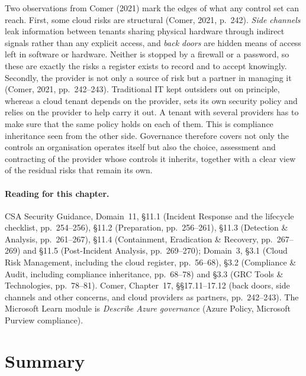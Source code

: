 Two observations from Comer (2021) mark the edges of what any control set
can reach. First, some cloud risks are structural (Comer, 2021, p.~242).
\emph{Side channels} leak information between tenants sharing physical
hardware through indirect signals rather than any explicit access, and
\emph{back doors} are hidden means of access left in software or hardware.
Neither is stopped by a firewall or a password, so these are exactly the
risks a register exists to record and to accept knowingly. Secondly, the
provider is not only a source of risk but a partner in managing it (Comer,
2021, pp.~242--243). Traditional IT kept outsiders out on principle,
whereas a cloud tenant depends on the provider, sets its own security policy
and relies on the provider to help carry it out. A tenant with several
providers has to make sure that the same policy holds on each of them. This
is compliance inheritance seen from the other side. Governance therefore
covers not only the controls an organisation operates itself but also the
choice, assessment and contracting of the provider whose controls it
inherits, together with a clear view of the residual risks that remain its
own.

\paragraph{Reading for this chapter.} CSA Security Guidance, Domain~11,
\S11.1 (Incident Response and the lifecycle checklist, pp.~254--256), \S11.2
(Preparation, pp.~256--261), \S11.3 (Detection \& Analysis, pp.~261--267),
\S11.4 (Containment, Eradication \& Recovery, pp.~267--269) and \S11.5
(Post-Incident Analysis, pp.~269--270); Domain~3, \S3.1 (Cloud Risk
Management, including the cloud register, pp.~56--68), \S3.2 (Compliance \&
Audit, including compliance inheritance, pp.~68--78) and \S3.3 (GRC Tools \&
Technologies, pp.~78--81). Comer, Chapter~17, \S\S17.11--17.12 (back doors,
side channels and other concerns, and cloud providers as partners,
pp.~242--243). The Microsoft Learn module is \emph{Describe Azure governance}
(Azure Policy, Microsoft Purview compliance).

\section{Summary}

